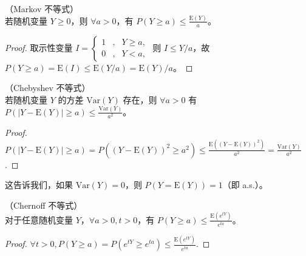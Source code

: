 \documentclass[../main.tex]{subfiles}
\begin{document}
\begin{theorem}\label{thm:5.1.1}
    （Markov 不等式）\\
    若随机变量 $Y\geq 0$，则 $\forall a>0$，有 $P(Y\geq a)\leq \frac{\mathrm E(Y)}a$。
\end{theorem}

\begin{proof}
    取示性变量 $I=\left\{
        \begin{aligned}
            1 & , & Y\geq a, \\
            0 & , & Y<a,
        \end{aligned}\right.$ 则 $I\leq Y/a$，故 $P(Y\geq a)=\mathrm E(I)\leq \mathrm E(Y/a)=\mathrm E(Y)/a$。
\end{proof}



\begin{theorem}\label{thm:5.1.2}
    （Chebyshev 不等式）\\
    若随机变量 $Y$ 的方差 $\mathrm{Var}(Y)$ 存在，则 $\forall a>0$ 有 $P(|Y-\mathrm E(Y)|\geq a)\leq \frac{\mathrm{Var}(Y)}{a^2}$。
\end{theorem}

\begin{proof}
    $P(|Y-\mathrm E(Y)|\geq a)=P((Y-\mathrm E(Y))^2\geq a^2)\leq \frac{\mathrm E((Y-\mathrm E(Y))^2)}{a^2}=\frac{\mathrm{Var}(Y)}{a^2}$.
\end{proof}

这告诉我们，如果 $\mathrm{Var}(Y)=0$，则 $P(Y=\mathrm E(Y))=1$（即 a.s.）。

\begin{theorem}\label{thm:5.1.3}
    （Chernoff 不等式）\\
    对于任意随机变量 $Y$，$\forall a>0,t>0$，有 $P(Y\geq a)\leq\frac{\mathrm E(e^{tY})}{e^{ta}}$。
\end{theorem}

\begin{proof}
    $\forall t>0,P(Y\geq a)=P(e^{tY}\geq e^{ta})\leq\frac{\mathrm E(e^{tY})}{e^{ta}}.$
\end{proof}
\end{document}
